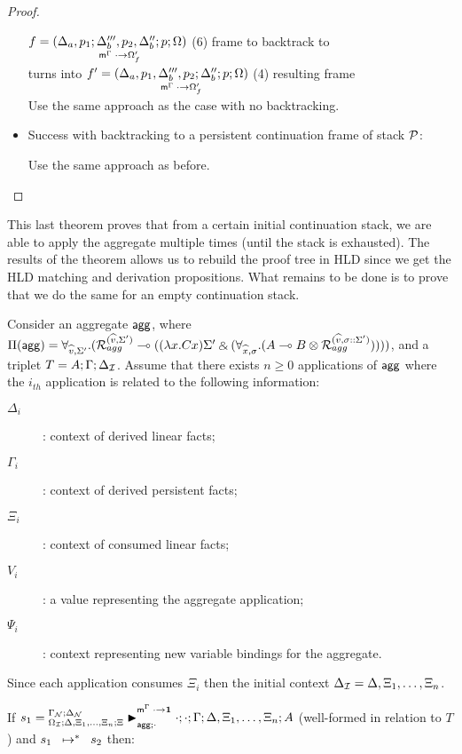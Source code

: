 \begin{proof}
\begin{itemize}[leftmargin=*]
      $f = \lframe{\Delta_a, p_1}{\Delta'''_b, p_2, \Delta''_b}{p}{\Omega}{\cdot}{\Omega'_f}$
      (6) frame to backtrack to \\
      turns into $f' = \lframe{\Delta_a, p_1, \Delta'''_b, p_2}{\Delta''_b}{p}{\Omega}{\cdot}{\Omega'_f}$
      \hfill (4) resulting frame \\

      Use the same approach as the case with no backtracking.
      
   \item Success with backtracking to a persistent continuation frame of stack
   $\lstack{P}$:

      Use the same approach as before.
      
\end{itemize}
\end{proof}

This last theorem proves that from a certain initial continuation stack, we are
able to apply the aggregate multiple times (until the stack is exhausted). The
results of the theorem allows us to rebuild the proof tree in HLD since we get
the HLD matching and derivation propositions. What remains to be done is to
prove that we do the same for an empty continuation stack.

\begin{lemma}\label{thm:aggregates}
Consider an aggregate $\m{agg}$, where $\Pi(\m{agg}) = \forall_{\widehat{v}, \Sigma'}.
   (\defstwo{agg}{\widehat{v}}{\Sigma'} \lolli ((\lambda x. C x)\Sigma' \with (\forall_{\widehat{x}, \sigma}.
                                                (A \lolli B \otimes
                                                 \defstwo{agg}{\widehat{v}}{\sigma
                                                 ::\Sigma'}))))$,
and a triplet $T = A; \Gamma; \deltan$.
Assume that there exists $n \geq 0$ applications of $\m{agg}$
where the $i_{th}$ application is related to the following information:
\begin{description}
   \item[$\Delta_i$]: context of derived linear facts;
   \item[$\Gamma_i$]: context of derived persistent facts;
   \item[$\Xi_i$]: context of consumed linear facts;
   \item[$V_i$]: a value representing the aggregate application;
   \item[$\Psi_i$]: context representing new variable bindings for the aggregate.
\end{description}

Since each application consumes $\Xi_i$ then the initial context $\deltan =
\Delta, \Xi_1, \dotsc, \Xi_n$.

If $s_1 = \matstatea{\Delta, \Xi_1, \dotsc, \Xi_n}{\cdot;
   \cdot}{\Gamma}{\Delta, \Xi_1, \dotsc, \Xi_n}{A}{\cdot \rightarrow \one}{\cdot}$
   (well-formed in relation to $T$) and $\transs{s_1}{s_2}$ then:



\end{lemma}

